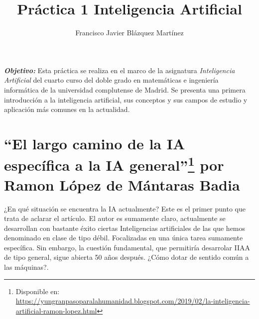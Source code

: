 \documentclass[final]{CSP}
\begin{document}
\begin{frontmatter}

\title{Práctica 1 Inteligencia Artificial}

\author{Francisco Javier Blázquez Martínez}

\begin{keyword}\rm
\begin{adjustwidth}{2cm}{2cm}{\itshape\textbf{Objetivo:}}  
Esta práctica se realiza en el marco de la asignatura \textit{Inteligencia Artificial} del
cuarto curso del doble grado en matemáticas e ingeniería informática de la universidad 
complutense de Madrid. Se presenta una primera introducción a la inteligencia artificial,
sus conceptos y sus campos de estudio y aplicación más comunes en la actualidad. 
\end{adjustwidth}
\end{keyword}

\end{frontmatter}

\vspace{7mm}
\setlength\parindent{0cm}

\section{``El largo camino de la IA específica a la IA general''\footnote{Disponible en: \url{https://yungranpasoparalahumanidad.blogspot.com/2019/02/la-inteligencia-artificial-ramon-lopez.html}} por Ramon López de Mántaras Badia}

¿En qué situación se encuentra la IA actualmente? Este es el primer punto que trata de aclarar
el artículo. El autor es sumamente claro, actualmente se desarrollan con bastante éxito ciertas
Inteligencias artificiales de las que hemos denominado en clase de tipo débil. Focalizadas en
una única tarea sumamente específica. Sin embargo, la cuestión fundamental, que permitiría 
desarrolar IIAA de tipo general, sigue abierta 50 años después. ¿Cómo dotar de sentido común a
las máquinas?.\\
\end{document}

